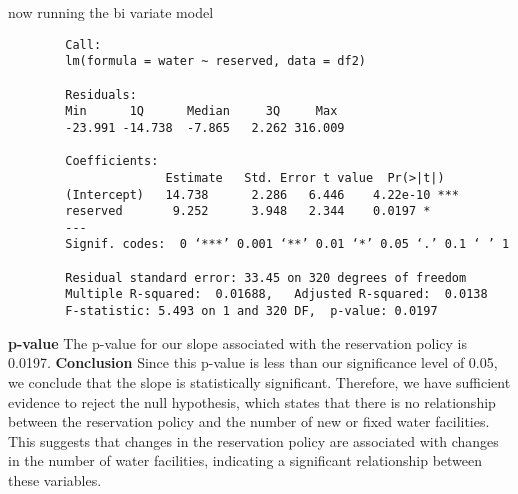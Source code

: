 \documentclass[12pt,letterpaper]{article}
\begin{document}
	now running the bi variate model
	
	\begin{verbatim}
		Call:
		lm(formula = water ~ reserved, data = df2)
		
		Residuals:
		Min      1Q      Median     3Q     Max 
		-23.991 -14.738  -7.865   2.262 316.009 
		
		Coefficients:
		              Estimate   Std. Error t value  Pr(>|t|)    
		(Intercept)   14.738      2.286   6.446    4.22e-10 ***
		reserved       9.252      3.948   2.344    0.0197 * 
		---
		Signif. codes:  0 ‘***’ 0.001 ‘**’ 0.01 ‘*’ 0.05 ‘.’ 0.1 ‘ ’ 1
		
		Residual standard error: 33.45 on 320 degrees of freedom
		Multiple R-squared:  0.01688,	Adjusted R-squared:  0.0138 
		F-statistic: 5.493 on 1 and 320 DF,  p-value: 0.0197
	\end{verbatim}
	\textbf{p-value}
	\newline
	The p-value for our slope associated with the reservation policy is 0.0197.
	\newline
	\textbf{Conclusion} 
	\newline
	Since this p-value is less than our significance level of 0.05, we conclude that the slope is statistically significant. Therefore, we have sufficient evidence to reject the null hypothesis, which states that there is no relationship between the reservation policy and the number of new or fixed water facilities. This suggests that changes in the reservation policy are associated with changes in the number of water facilities, indicating a significant relationship between these variables.
	\vspace{0.8cm}
	
\end{document}
